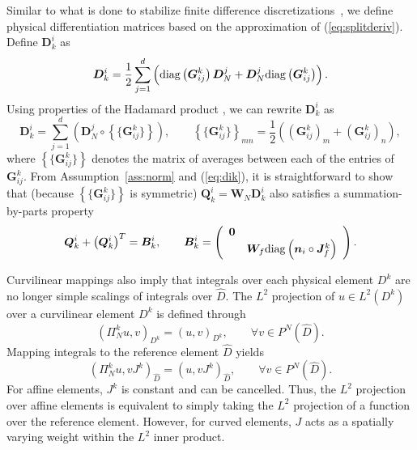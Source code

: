 \documentclass[10pt]{amsart}
\theoremstyle{definition}
\theoremstyle{lemma}
\theoremstyle{theorem}
\theoremstyle{assumption}
\renewcommand{\hat}{\widehat}
\newcommand{\LRp}[1]{\left( #1 \right)}
\newcommand{\LRc}[1]{\left\{ #1 \right\}}
\newcommand{\avg}[1] {\ensuremath{\LRc{\!\{#1\}\!}}}
\newcommand{\diag}[1]{{\rm diag}\LRp{#1}}
\begin{document}
{Similar to what is done to stabilize finite difference discretizations~\cite{nordstrom2006cfdf, gassner2016split}, we define physical differentiation matrices based on the approximation of (\ref{eq:splitderiv}).  Define $\bm{D}^i_k$ as
\[
  \bm{D}^i_k = \frac12 \sum_{j=1}^d \left(\diag{\bm{G}^k_{ij}}\bm{D}^j_N + \bm{D}^j_N\diag{\bm{G}^k_{ij}}\right).
\]
Using properties of the Hadamard product \cite{horn2012matrix}, we can rewrite $\bm{D}^i_k$ as 
\begin{equation}
\bm{D}^i_k = \sum_{j=1}^d \LRp{\bm{D}^j_N \circ \avg{\bm{G}^k_{ij}}}, \qquad \avg{\bm{G}^k_{ij}}_{mn} = \frac{1}{2}\LRp{\LRp{\bm{G}^k_{ij}}_m + \LRp{\bm{G}^k_{ij}}_n},
\label{eq:dik}
\end{equation}
where $\avg{\bm{G}^k_{ij}}$ denotes the matrix of averages between each of the entries of $\bm{G}^k_{ij}$.  From Assumption~\ref{ass:norm} and (\ref{eq:dik}), it is straightforward to show that (because $\avg{\bm{G}^k_{ij}}$ is symmetric) $\bm{Q}^i_k = \bm{W}_N\bm{D}^i_k$ also satisfies a summation-by-parts property
\begin{equation}
\bm{Q}^i_k + \LRp{\bm{Q}^i_k}^T = \bm{B}^i_k, \qquad \bm{B}^i_k = 
\LRp{\begin{array}{cc}
\bm{0}&\\
& \bm{W}_f \diag{\bm{n}_i\circ\bm{J}^k_f}
\end{array}}.
\label{eq:sbpk}
\end{equation}

Curvilinear mappings also imply that integrals over each physical element $D^k$ are no longer simple scalings of integrals over $\hat{D}$.  The $L^2$ projection of $u\in L^2\LRp{D^k}$ over a curvilinear element $D^k$ is defined through 
\begin{equation}
\LRp{\Pi^k_N u,v}_{D^k} = \LRp{u,v}_{D^k}, \qquad \forall v\in P^N\LRp{\hat{D}}.
\label{eq:l2curv}
\end{equation}
Mapping integrals to the reference element $\hat{D}$ yields
\begin{equation}
\LRp{\Pi^k_N u,v J^k}_{\hat{D}} = \LRp{u,vJ^k}_{\hat{D}}, \qquad \forall v\in P^N\LRp{\hat{D}}.
\label{eq:l2curvmap}
\end{equation}
For affine elements, $J^k$ is constant and can be cancelled.  Thus, the $L^2$ projection over affine elements is equivalent to simply taking the $L^2$ projection of a function over the reference element.  However, for curved elements, $J$ acts as a spatially varying weight within the $L^2$ inner product.  

}
\end{document}
